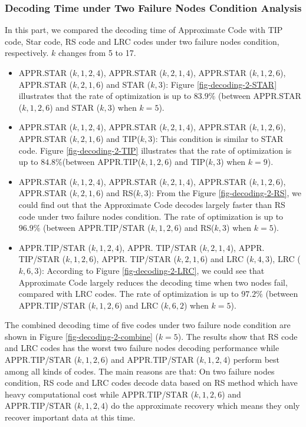 \documentclass[sigconf]{acmart}
\begin{document}
\subsubsection{Decoding Time under Two Failure Nodes Condition Analysis}
In this part, we compared the decoding time of Approximate Code with TIP code, Star code, RS code and LRC codes under two failure nodes condition, respectively. $k$ changes from 5 to 17. 
\begin{itemize}
    \item APPR.STAR ($k,1,2,4$), APPR.STAR ($k,2,1,4$), APPR.STAR ($k,1,2,6$), APPR.STAR ($k,2,1,6$) and STAR ($k,3$): Figure \ref{fig-decoding-2-STAR} illustrates that the rate of optimization is up to $83.9\%$ (between APPR.STAR ($k,1,2,6$) and STAR ($k,3$) when $k = 5$). 
    \item APPR.STAR ($k,1,2,4$), APPR.STAR ($k,2,1,4$),  APPR.STAR ($k,1,2,6$), APPR.STAR ($k,2,1,6$) and TIP($k,3$): This condition is similar to STAR code. Figure \ref{fig-decoding-2-TIP} illustrates that the rate of optimization is up to $84.8\% $(between APPR.TIP($k,1,2,6$) and TIP($k,3$) when $k = 9$).
    \item APPR.STAR ($k,1,2,4$), APPR.STAR ($k,2,1,4$),  APPR.STAR ($k,1,2,6$), APPR.STAR ($k,2,1,6$) and RS($k,3$): From the Figure \ref{fig-decoding-2-RS}, we could find out that the Approximate Code decodes largely faster than RS code under two failure nodes condition. The rate of optimization is up to $96.9\%$ (between APPR.TIP/STAR ($k,1,2,6$) and RS($k,3$) when $k = 5$).
    \item APPR.TIP/STAR ($k,1,2,4$), APPR. TIP/STAR ($k,2,1,4$),  APPR. TIP/STAR ($k,1,2,6$), APPR. TIP/STAR ($k,2,1,6$) and LRC ($k,4,3$), LRC ($k,6,3$): 
    According to Figure \ref{fig-decoding-2-LRC}, we could see that Approximate Code largely reduces the decoding time when two nodes fail, compared with LRC codes. The rate of optimization is up to $97.2\%$ (between APPR.TIP/STAR ($k,1,2,6$) and LRC ($k, 6, 2$) when $k = 5$).
\end{itemize}

The combined decoding time of five codes under two failure node condition are shown in Figure \ref{fig-decoding-2-combine} ($k=5$). The results show that RS code and LRC codes has the worst two failure nodes decoding performance while APPR.TIP/STAR ($k,1,2,6$) and APPR.TIP/STAR ($k,1,2,4$) perform best among all kinds of codes. The main reasons are that: On two failure nodes condition, RS code and LRC codes decode data based on RS method which have heavy computational cost while APPR.TIP/STAR ($k,1,2,6$) and APPR.TIP/STAR ($k,1,2,4$) do the approximate recovery which means they only recover important data at this time.
\end{document}
